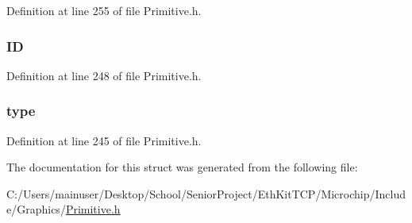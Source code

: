 Definition at line 255 of file Primitive.\+h.

\hypertarget{struct_g_f_x___e_x_t_d_a_t_a_a79cf9bf3b48476101422d9b453e0945a}{}
\subsubsection[{I\+D}]{ I\+D}\label{struct_g_f_x___e_x_t_d_a_t_a_a79cf9bf3b48476101422d9b453e0945a}


Definition at line 248 of file Primitive.\+h.

\hypertarget{struct_g_f_x___e_x_t_d_a_t_a_ad19c8e0d19c638be9dd81d163454b0f1}{}
\subsubsection[{type}]{ type}\label{struct_g_f_x___e_x_t_d_a_t_a_ad19c8e0d19c638be9dd81d163454b0f1}


Definition at line 245 of file Primitive.\+h.



The documentation for this struct was generated from the following file\+:\begin{DoxyCompactItemize}
\item 
C\+:/\+Users/mainuser/\+Desktop/\+School/\+Senior\+Project/\+Eth\+Kit\+T\+C\+P/\+Microchip/\+Include/\+Graphics/\hyperlink{_primitive_8h}{Primitive.\+h}\end{DoxyCompactItemize}

